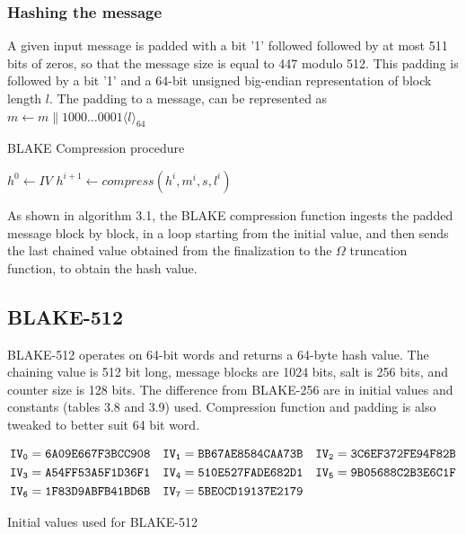   \subsubsection{Hashing the message}

  A given input message is padded with a bit '1' followed followed by at most 511 bits of zeros, so that the message 
  size is equal to 447 modulo 512. This padding is followed by a bit '1' and a 64-bit unsigned big-endian representation
  of block length $l$. The padding to a message, can be represented as $m \gets m \parallel 1000 \dots 0001\langle l \rangle_{64}$

  \begin{algorithm}
  \caption{BLAKE Compression procedure \cite{00002}}
  \begin{algorithmic}[1]
    \State $ h^{0} \gets IV $
      \State $h^{i+1} \gets compress(h^{i}, m^{i}, s, l^{i})$
    \EndFor
    \State{}
  \end{algorithmic}
  \end{algorithm}

  As shown in algorithm 3.1, the BLAKE compression function ingests the padded message block by block, in a loop 
  starting from the initial value, and then sends the last chained value obtained from the finalization to the 
  $\Omega$ truncation function, to obtain the hash value.

\subsection{BLAKE-512}

BLAKE-512 operates on 64-bit words and returns a 64-byte hash value. The chaining value is 512 bit long, message blocks are
1024 bits, salt is 256 bits, and counter size is 128 bits. The difference from BLAKE-256 are in initial values and constants
(tables 3.8 and 3.9) used. Compression function and padding is also tweaked to better suit 64 bit word.

  \begin{table}[H]
    \begin{align*}
      {\tt IV_{0}} &= {\tt 6A09E667F3BCC908} & {\tt IV_{1}} &= {\tt BB67AE8584CAA73B} & {\tt IV_{2}} &= {\tt 3C6EF372FE94F82B} \\
      {\tt IV_{3}} &= {\tt A54FF53A5F1D36F1} & {\tt IV_{4}} &= {\tt 510E527FADE682D1} & {\tt IV_{5}} &= {\tt 9B05688C2B3E6C1F} \\
      {\tt IV_{6}} &= {\tt 1F83D9ABFB41BD6B} & {\tt IV_{7}} &= {\tt 5BE0CD19137E2179} &                                        \\      
    \end{align*}
    \caption{Initial values used for BLAKE-512 \cite{00002}}
  \end{table}
  
